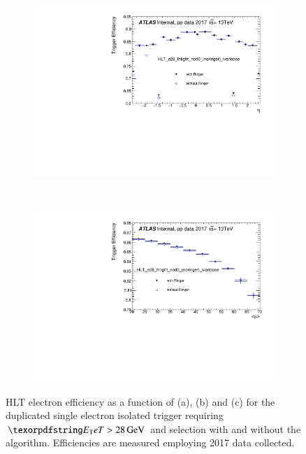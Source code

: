 \begin{figure}[h!tb]
\begin{center}
\begin{subfigure}[c]{.59\textwidth}
  \end{subfigure} \\
  \begin{subfigure}[c]{.59\textwidth}
  \centering
  \includegraphics[width=\textwidth]{sections/04_operation/figures/efficiencies/eff_EGAM1_e28_ringer_and_noringer_2017_after_ts1_HLT_eta.pdf}
  \caption{}%
  \end{subfigure} \\
  \begin{subfigure}[c]{.59\textwidth}
  \centering
  \includegraphics[width=\textwidth]{sections/04_operation/figures/efficiencies/eff_EGAM1_e28_ringer_and_noringer_2017_after_ts1_HLT_mu.pdf}
  \caption{}%
  \label{fig:e28_comp_mu}
  \end{subfigure}
  \caption{\label{fig:e28_triggers}HLT electron efficiency as a function of \et{}
    (a), \eta{} (b) and \avgmu{} (c) for the duplicated single electron isolated trigger
    requiring $\et{} > \SI{28}{\GeV}$ and \tight{} selection with and without the
    \rnn{} algorithm. Efficiencies are measured employing 2017 data collected.}
  \end{center}
\end{figure}
  
